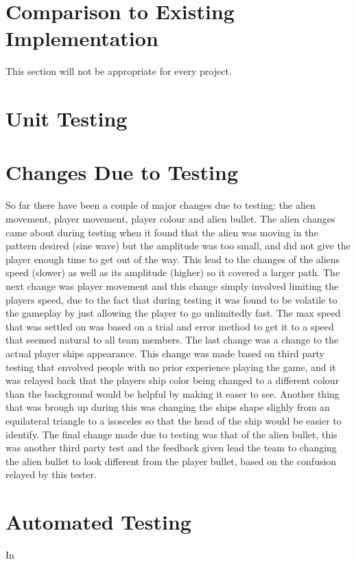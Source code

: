 \documentclass[12pt, titlepage]{article}
\begin{document}
\section{Comparison to Existing Implementation}

This section will not be appropriate for every project.

\section{Unit Testing}

\section{Changes Due to Testing}
So far there have been a couple of major changes due to testing: the alien movement, player movement, player colour and alien bullet. The alien changes came about during testing when it found that the alien was moving in the pattern desired (sine wave) but the amplitude was too small, and did not give the player enough time to get out of the way. This lead  to the changes of the aliens speed (slower) as well as its amplitude (higher) so it covered a larger path. The next change was player movement and this change simply involved limiting the players speed, due to the fact that during testing it was found to be volatile to the gameplay by just allowing the player to go unlimitedly fast. The max speed that was settled on was based on a trial and error method to get it to a speed that seemed natural to all team members. The last change was a change to the actual player ships appearance. This change was made based on third party testing that envolved people with no prior experience playing the game, and it was relayed back that the players ship color being changed to a different colour than the background would be helpful by making it easer to see. Another thing that was brough up during this was changing the ships shape slighly from an equilateral triangle to a isosceles so that the head of the ship would be easier to identify. The final change made due to testing was that of the alien bullet, this was another third party test and the feedback given lead the team to changing the alien bullet to look  different from the player bullet, based on the confusion relayed by this tester.

\section{Automated Testing}
In
\end{document}
